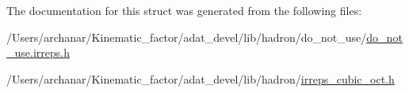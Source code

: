 The documentation for this struct was generated from the following files\+:\begin{DoxyCompactItemize}
\item 
/\+Users/archanar/\+Kinematic\+\_\+factor/adat\+\_\+devel/lib/hadron/do\+\_\+not\+\_\+use/\mbox{\hyperlink{do__not__use_8irreps_8h}{do\+\_\+not\+\_\+use.\+irreps.\+h}}\item 
/\+Users/archanar/\+Kinematic\+\_\+factor/adat\+\_\+devel/lib/hadron/\mbox{\hyperlink{lib_2hadron_2irreps__cubic__oct_8h}{irreps\+\_\+cubic\+\_\+oct.\+h}}\end{DoxyCompactItemize}
